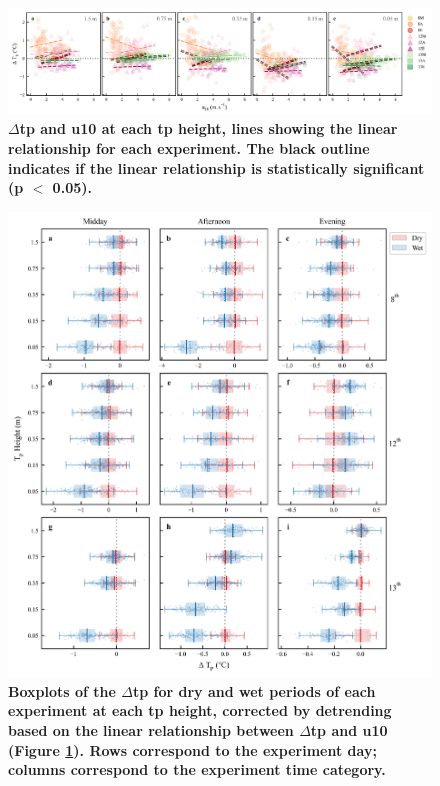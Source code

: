 \documentclass[final,3p,times,authoryear]{elsarticle}
\begin{document}

\begin{figure}
\centering
\includegraphics[trim={0 0 0 0},clip,scale=1.0]{pict041.png}
\caption{\bf $\Delta$\gls{tp} and \gls{u10} at each \gls{tp} height, lines showing the linear relationship for each experiment. The black outline indicates if the linear relationship is statistically significant (\gls{p} $<$ 0.05).}
 \label{fig:7.12}
\end{figure}



\begin{figure}
\centering
\includegraphics[trim={0 0 0 0},clip,scale=1.0]{pict042.png}
\caption{\bf Boxplots of the $\Delta$\gls{tp} for dry and wet periods of each experiment at each \gls{tp} height, corrected by detrending based on the linear relationship between $\Delta$\gls{tp} and \gls{u10} (Figure \ref{fig:7.12}). Rows correspond to the experiment day; columns correspond to the experiment time category.}
 \label{fig:7.13}
\end{figure}
\end{document}
